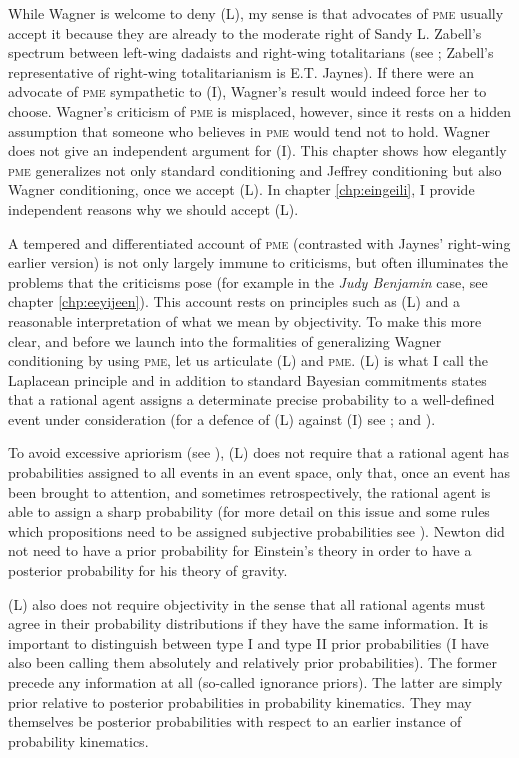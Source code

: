 \documentclass[phd,12pt,oneside]{ubcthesis}
\begin{document}
\medskip

While Wagner is welcome to deny (L), my sense is that advocates of \textsc{pme}
usually accept it because they are already to the moderate right of
Sandy L. Zabell's spectrum between left-wing dadaists and right-wing
totalitarians (see ; Zabell's representative of
right-wing totalitarianism is E.T. Jaynes). If there were an advocate
of \textsc{pme} sympathetic to (I), Wagner's result would indeed force her to
choose. Wagner's criticism of \textsc{pme} is misplaced, however, since it
rests on a hidden assumption that someone who believes in \textsc{pme} would
tend not to hold. Wagner does not give an independent argument for
(I). This chapter shows how elegantly \textsc{pme} generalizes not only standard
conditioning and Jeffrey conditioning but also Wagner conditioning,
once we accept (L). In chapter \ref{chp:eingeili}, I provide
independent reasons why we should accept (L).

A tempered and differentiated account of \textsc{pme} (contrasted with
Jaynes' right-wing earlier version) is not only largely immune to
criticisms, but often illuminates the problems that the criticisms
pose (for example in the \emph{Judy Benjamin} case, see chapter
\ref{chp:eeyijeen}). This account rests on principles such as (L) and
a reasonable interpretation of what we mean by objectivity. To make
this more clear, and before we launch into the formalities of
generalizing Wagner conditioning by using \textsc{pme}, let us
articulate (L) and \textsc{pme}. (L) is what I call the Laplacean
principle and in addition to standard Bayesian commitments states that
a rational agent assigns a determinate precise probability to a
well-defined event under consideration (for a defence of (L) against
(I) see ; and ).

To avoid excessive apriorism (see ), (L)
does not require that a rational agent has probabilities assigned to
all events in an event space, only that, once an event has been
brought to attention, and sometimes retrospectively, the rational
agent is able to assign a sharp probability (for more detail on this
issue and some rules which propositions need to be assigned subjective
probabilities see ). Newton did not need to
have a prior probability for Einstein's theory in order to have a
posterior probability for his theory of gravity.

(L) also does not require objectivity in the sense that all rational
agents must agree in their probability distributions if they have the
same information. It is important to distinguish between type I and
type II prior probabilities (I have also been calling them absolutely
and relatively prior probabilities). The former precede any
information at all (so-called ignorance priors). The latter are simply
prior relative to posterior probabilities in probability kinematics.
They may themselves be posterior probabilities with respect to an
earlier instance of probability kinematics.
\end{document}
